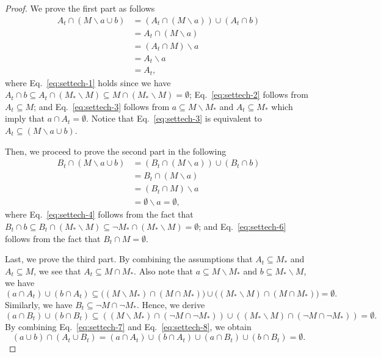 \documentclass{article}
\newcommand{\del}{\backslash}
\begin{document}
\begin{proof}
We prove the first part as follows
\begin{align}
A_t \cap (M \del a \cup b) &= 
(A_t \cap (M \del a)) \cup (A_t \cap b) \nonumber \\
&= A_t \cap (M \del a) \label{eq:settech-1}\\
&= (A_t \cap M) \del a \nonumber \\
&= A_t \del a \label{eq:settech-2} \\
&= A_t\label{eq:settech-3},
\end{align}
where Eq.~\eqref{eq:settech-1} holds since we have $A_t\cap b \subseteq A_t \cap (M_* \del M) \subseteq M \cap (M_*\del M) = \emptyset$;
Eq.~\eqref{eq:settech-2} follows from $A_t \subseteq M$;
and Eq.~\eqref{eq:settech-3} follows from $a\subseteq M\del M_*$ and $A_t \subseteq M_*$ which imply that $a\cap A_t = \emptyset$.
Notice that Eq.~\eqref{eq:settech-3} is equivalent to $A_t \subseteq (M \del a \cup b)$.

Then, we proceed to prove the second part in the following
\begin{align}
B_t \cap (M \del a \cup b )
&= 
(B_t \cap (M \del a)) \cup (B_t \cap b) \nonumber\\
&=
B_t \cap (M \del a) \label{eq:settech-4}\\
&=
(B_t \cap M) \del a \nonumber\\
&= \emptyset \del a = \emptyset,\label{eq:settech-6}
\end{align}
where Eq.~\eqref{eq:settech-4} follows from the fact that $B_t\cap b \subseteq B_t \cap (M_*\del M) \subseteq \neg M_* \cap (M_* \del M) = \emptyset$; and 
Eq.~\eqref{eq:settech-6} follows from the fact that $B_t\cap M =\emptyset$.

Last, we prove the third part. 
By combining the assumptions that $A_t\subseteq M_*$ and $A_t\subseteq M$,
we see that $A_t \subseteq M \cap M_*$.
Also note that $a\subseteq M\del M_*$ and $b\subseteq M_*\del M$, we have
\begin{equation}
\label{eq:settech-7}
(a \cap A_t) \cup (b\cap A_t) \subseteq \big( (M\del M_*) \cap (M \cap M_*) \big) \cup \big((M_* \del M) \cap (M \cap M_*) \big) = \emptyset.
\end{equation}
Similarly, we have $B_t \subseteq \neg M \cap \neg M_*$. Hence, we derive
\begin{equation}
\label{eq:settech-8}
(a \cap B_t) \cup (b\cap B_t) \subseteq ( (M\del M_*) \cap (\neg M \cap  \neg M_*)) \cup ((M_* \del M) \cap (\neg M \cap \neg M_*)) = \emptyset.
\end{equation}
By combining Eq.~\eqref{eq:settech-7} and Eq.~\eqref{eq:settech-8}, we obtain
$$
(a\cup b) \cap (A_t \cup B_t) = (a\cap A_t) \cup (b\cap A_t) \cup (a \cap B_t) \cup (b\cap B_t) = \emptyset.
$$
\end{proof}
\end{document}
